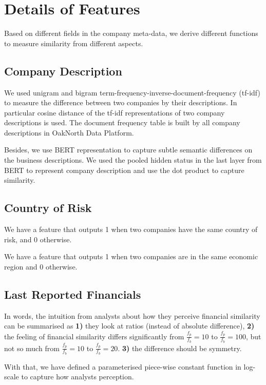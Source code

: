 \documentclass[]{article}
\begin{document}



\appendix
\section{Details of Features}
Based on different fields in the company meta-data, we derive different 
functions to measure similarity from different aspects. 

\subsection{Company Description}
We used unigram and bigram 
term-frequency-inverse-document-frequency (tf-idf)\cite{saltonIR} to measure 
the difference between two companies by their descriptions. In particular 
cosine distance of the tf-idf representations of two company 
descriptions is used. The document frequency table is built by all company 
descriptions in OakNorth Data Platform.

Besides, we use BERT\cite{devlin2018bert} representation to capture subtle 
semantic differences on the business descriptions. We used the pooled hidden 
status in the last layer from BERT to represent company description and use the 
dot product to capture similarity.

\subsection{Country of Risk}
We have a feature that outputs 1 when two companies have the same country of 
risk, and 0 otherwise. 

We have a feature that outputs 1 when two companies are in the same economic 
region and 0 otherwise.

\subsection{Last Reported Financials}
In words, the intuition from analysts about how they perceive financial 
similarity can be 
summarised as \textbf{1)} they look at ratios (instead of absolute difference), 
\textbf{2)} the feeling of financial similarity differs significantly from 
$\frac{f_p}{f_b}=10$ to $\frac{f_p}{f_b}=100$, but not so 
much from $\frac{f_p}{f_b}=10$ to $\frac{f_p}{f_b}=20$. \textbf{3)} the 
difference should be symmetry.

With that, we have defined a parameterised piece-wise constant function in 
log-scale to capture how analysts perception.
\end{document}
